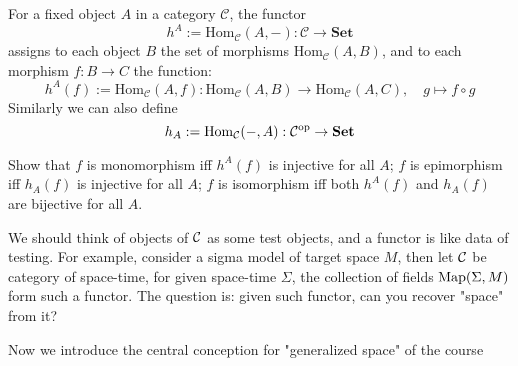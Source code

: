 \begin{example}
  For a fixed object $A$ in a category $\mathcal{C}$, the functor
    \[
    h^A:=\mathrm{Hom}_{\mathcal{C}}(A, -): \mathcal{C} \to \mathbf{Set}
    \]
    assigns to each object $B$ the set of morphisms $\mathrm{Hom}_{\mathcal{C}}(A, B)$, and to each morphism $f: B \to C$ the function:
    \[
    h^A(f):=\mathrm{Hom}_{\mathcal{C}}(A, f): \mathrm{Hom}_{\mathcal{C}}(A, B) \to \mathrm{Hom}_{\mathcal{C}}(A, C), \quad g \mapsto f \circ g
    \]
    Similarly we can also define
    \[
    h_A:=\mathrm{Hom}_{\mathcal{C}}(-, A): \mathcal{C}^{\mathrm{op}} \to \mathbf{Set}
    \]
\end{example}
\begin{exercise}
 Show that $f$ is monomorphism iff $h^A(f)$ is injective for all $A$; $f$ is epimorphism iff $h_A(f)$ is injective for all $A$; $f$ is isomorphism iff both $h^A(f)$ and $h_A(f)$ are bijective for all $A$.
\end{exercise}
\begin{remark}
 We should think of objects of $\mathcal{C}$ as some test objects, and a functor is like data of testing. For example, consider a sigma model of target space $M$, then let $\mathcal{C}$ be category of space-time, for given space-time $\Sigma$, the collection of fields $ \mathrm{Map}(\Sigma, M)$ form such a functor. The question is: given such functor, can you recover "space" from it?
\end{remark}
  
Now we introduce the central conception for "generalized space" of the course

